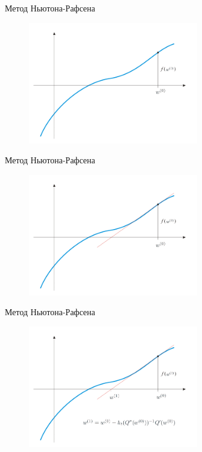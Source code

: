 \documentclass[10pt]{beamer}
\begin{document}
\begin{frame}{Метод Ньютона-Рафсена}
	\begin{figure}[htbp]
	  \includegraphics[height=150pt, keepaspectratio = true]{images/newton-2}   
	\end{figure}
\end{frame}

\begin{frame}{Метод Ньютона-Рафсена}
	\begin{figure}[htbp]
	  \includegraphics[height=150pt, keepaspectratio = true]{images/newton-3}   
	\end{figure}
\end{frame}

\begin{frame}{Метод Ньютона-Рафсена}
	\begin{figure}[htbp]
	  \includegraphics[height=150pt, keepaspectratio = true]{images/newton-4}   
	\end{figure}
\end{frame}
\end{document}

